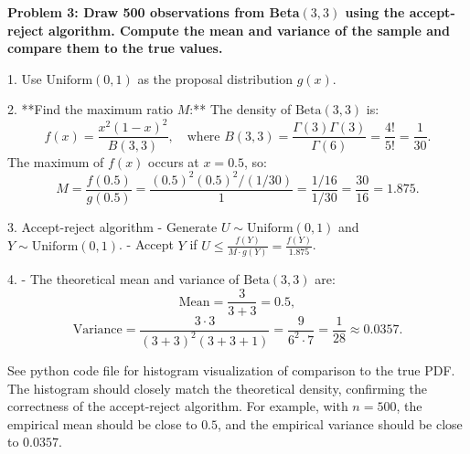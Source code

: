 \documentclass[12pt]{article}
\begin{document}
\begin{homeworkProblem}
\textbf{Problem 3: Draw 500 observations from Beta$(3,3)$ using the accept-reject algorithm. Compute the mean and variance of the sample and compare them to the true values.}

\begin{solution}

1. 
   Use \( \text{Uniform}(0,1) \) as the proposal distribution \( g(x) \).

2. **Find the maximum ratio \( M \):**
   The density of \( \text{Beta}(3,3) \) is:
   \[
   f(x) = \frac{x^{2} (1-x)^{2}}{B(3,3)}, \quad \text{where } B(3,3) = \frac{\Gamma(3)\Gamma(3)}{\Gamma(6)} = \frac{4!}{5!} = \frac{1}{30}.
   \]
   The maximum of \( f(x) \) occurs at \( x = 0.5 \), so:
   \[
   M = \frac{f(0.5)}{g(0.5)} = \frac{(0.5)^2 (0.5)^2 / (1/30)}{1} = \frac{1/16}{1/30} = \frac{30}{16} = 1.875.
   \]

3. Accept-reject algorithm
   - Generate \( U \sim \text{Uniform}(0,1) \) and \( Y \sim \text{Uniform}(0,1) \).
   - Accept \( Y \) if \( U \leq \frac{f(Y)}{M \cdot g(Y)} = \frac{f(Y)}{1.875} \).

4.
   - The theoretical mean and variance of \( \text{Beta}(3,3) \) are:
     \[
     \text{Mean} = \frac{3}{3 + 3} = 0.5,
     \]
     \[
     \text{Variance} = \frac{3 \cdot 3}{(3 + 3)^2 (3 + 3 + 1)} = \frac{9}{6^2 \cdot 7} = \frac{1}{28} \approx 0.0357.
     \]

   See python code file for histogram visualization of comparison to the true PDF. The histogram should closely match the theoretical density, confirming the correctness of the accept-reject algorithm. For example, with \( n = 500 \), the empirical mean should be close to \( 0.5 \), and the empirical variance should be close to \( 0.0357 \).
\end{solution}
\end{homeworkProblem}
\end{document}
